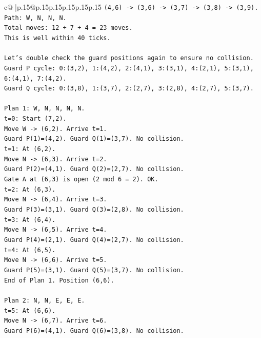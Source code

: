 \documentclass{article}
\begin{document}
{\begin{supertabular}{c@{$\;$}|p{.15\linewidth}@{}p{.15\linewidth}p{.15\linewidth}p{.15\linewidth}p{.15\linewidth}p{.15\linewidth}}
{{{\texttt{(4,6) {-}> (3,6) {-}> (3,7) {-}> (3,8) {-}> (3,9).} \\
\texttt{Path: W, N, N, N.} \\
\texttt{Total moves: 12 + 7 + 4 = 23 moves.} \\
\texttt{This is well within 40 ticks.} \\
\\ 
\texttt{Let's double check the guard positions again to ensure no collision.} \\
\texttt{Guard P cycle: 0:(3,2), 1:(4,2), 2:(4,1), 3:(3,1), 4:(2,1), 5:(3,1), 6:(4,1), 7:(4,2).} \\
\texttt{Guard Q cycle: 0:(3,8), 1:(3,7), 2:(2,7), 3:(2,8), 4:(2,7), 5:(3,7).} \\
\\ 
\texttt{Plan 1: W, N, N, N, N.} \\
\texttt{t=0: Start (7,2).} \\
\texttt{Move W {-}> (6,2). Arrive t=1.} \\
\texttt{Guard P(1)=(4,2). Guard Q(1)=(3,7). No collision.} \\
\texttt{t=1: At (6,2).} \\
\texttt{Move N {-}> (6,3). Arrive t=2.} \\
\texttt{Guard P(2)=(4,1). Guard Q(2)=(2,7). No collision.} \\
\texttt{Gate A at (6,3) is open (2 mod 6 = 2). OK.} \\
\texttt{t=2: At (6,3).} \\
\texttt{Move N {-}> (6,4). Arrive t=3.} \\
\texttt{Guard P(3)=(3,1). Guard Q(3)=(2,8). No collision.} \\
\texttt{t=3: At (6,4).} \\
\texttt{Move N {-}> (6,5). Arrive t=4.} \\
\texttt{Guard P(4)=(2,1). Guard Q(4)=(2,7). No collision.} \\
\texttt{t=4: At (6,5).} \\
\texttt{Move N {-}> (6,6). Arrive t=5.} \\
\texttt{Guard P(5)=(3,1). Guard Q(5)=(3,7). No collision.} \\
\texttt{End of Plan 1. Position (6,6).} \\
\\ 
\texttt{Plan 2: N, N, E, E, E.} \\
\texttt{t=5: At (6,6).} \\
\texttt{Move N {-}> (6,7). Arrive t=6.} \\
\texttt{Guard P(6)=(4,1). Guard Q(6)=(3,8). No collision.} \\
}}}
\end{supertabular}}
\end{document}

